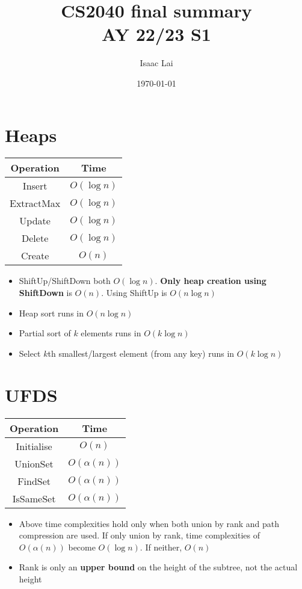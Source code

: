 \documentclass[frenchspacing,12pt,a4paper]{article}
\title{CS2040 final summary\\
\large AY 22/23 S1}
\date{\today}
\author{Isaac Lai}
\theoremstyle{remark}
\begin{document}
\maketitle

\section{Heaps}
\begin{center}
	\begin{tabular}{c|c}
		\textbf{Operation} & \textbf{Time}\\
		\hline
		Insert & $O(\log n)$\\\hline
		ExtractMax & $O(\log n)$\\\hline
		Update &  $O(\log n)$\\\hline
		Delete &  $O(\log n)$\\\hline
		Create &  $O(n)$ 
	\end{tabular}
\end{center}
\begin{itemize}
	\item ShiftUp/ShiftDown both $O(\log n)$. \textbf{Only heap creation using ShiftDown} is  $O(n)$. Using ShiftUp is  $O(n\log n)$
	\item Heap sort runs in $O(n\log n)$ 
	\item Partial sort of $k$ elements runs in $O(k\log n)$
	\item Select  $k$th smallest/largest element (from any key) runs in $O(k\log n)$ 
\end{itemize}

\section{UFDS}
\begin{center}
	\begin{tabular}{c|c}
		\textbf{Operation} & \textbf{Time}\\\hline
		Initialise & $O(n)$\\\hline
		UnionSet &  $O(\alpha(n))$\\\hline
		FindSet &  $O(\alpha(n))$\\\hline
		IsSameSet &  $O(\alpha(n))$
	\end{tabular}
\end{center}
\begin{itemize}
	\item Above time complexities hold only when both union by rank and path compression are used. If only union by rank, time complexities of $O(\alpha(n))$ become  $O(\log n)$. If neither, $O(n)$
	\item Rank is only an \textbf{upper bound} on the height of the subtree, not the actual height
\end{itemize}
\end{document}
